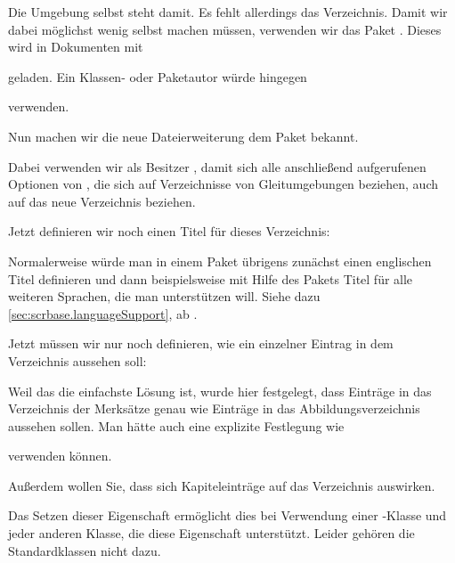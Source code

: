 Die Umgebung selbst steht damit. Es fehlt
allerdings das Verzeichnis. Damit wir dabei möglichst wenig selbst machen
müssen, verwenden wir das Paket . Dieses wird in Dokumenten
mit
\begin{lstcode}
  \usepackage{tocbasic}
\end{lstcode}
geladen. Ein Klassen- oder Paketautor würde hingegen
\begin{lstcode}
  \RequirePackage{tocbasic}
\end{lstcode}
verwenden.

Nun machen wir die neue Dateierweiterung dem Paket
 bekannt.
\begin{lstcode}
\end{lstcode}
Dabei verwenden wir als Besitzer , damit sich alle
anschließend aufgerufenen Optionen von \KOMAScript, die sich auf Verzeichnisse
von Gleitumgebungen beziehen, auch auf das neue Verzeichnis beziehen.

Jetzt definieren wir noch einen Titel für dieses
Verzeichnis:
\begin{lstcode}
  \newcommand*{\listoflorname}{Verzeichnis der Merksätze}
\end{lstcode}
Normalerweise würde man in einem Paket übrigens zunächst einen englischen
Titel definieren und dann beispielsweise mit Hilfe des Pakets
 Titel für alle weiteren Sprachen, die man unterstützen
will. Siehe dazu \autoref{sec:scrbase.languageSupport}, ab
.

Jetzt müssen wir nur
noch definieren, wie ein einzelner Eintrag in dem Verzeichnis aussehen soll:
\begin{lstcode}
  \newcommand*{\l@remarkbox}{\l@figure}
\end{lstcode}
Weil das die einfachste Lösung ist, wurde hier festgelegt, dass Einträge in
das Verzeichnis der Merksätze genau wie Einträge in das Abbildungsverzeichnis
aussehen sollen. Man hätte auch eine explizite Festlegung wie
\begin{lstcode}
\end{lstcode}
verwenden können.

Außerdem wollen Sie, dass sich Kapiteleinträge auf das
Verzeichnis auswirken.
\begin{lstcode}
\end{lstcode}
Das Setzen dieser Eigenschaft ermöglicht dies bei Verwendung einer
\KOMAScript-Klasse und jeder anderen Klasse, die diese Eigenschaft
unterstützt. Leider gehören die Standardklassen nicht dazu.

